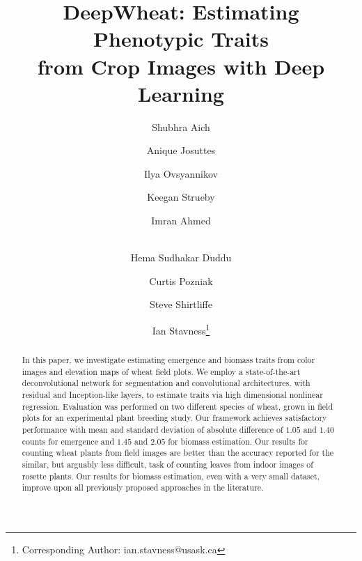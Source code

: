 \documentclass[10pt,twocolumn,letterpaper]{article}
\begin{document}
\title{DeepWheat: Estimating Phenotypic Traits \\from Crop Images with Deep Learning}


\author[1]{\vspace{-6pt}
Shubhra Aich}
\author[2]{Anique Josuttes}
\author[1]{Ilya Ovsyannikov}
\author[2]{Keegan Strueby}
\author[1]{Imran Ahmed}
\author[2]{\\Hema Sudhakar Duddu}
\author[2,3]{Curtis Pozniak}
\author[2]{Steve Shirtliffe}
\author[1]{Ian Stavness\thanks{Corresponding Author: ian.stavness@usask.ca}}






\maketitle

\ifwacvfinal\thispagestyle{empty}\fi

\begin{abstract}
In this paper, we investigate estimating emergence and biomass traits from color images and elevation maps of wheat field plots. We employ a state-of-the-art deconvolutional network for segmentation and convolutional architectures, with residual and Inception-like layers, to estimate traits via high dimensional nonlinear regression. Evaluation was performed on two different species of wheat, grown in field plots for an experimental plant breeding study. Our framework achieves satisfactory performance with mean and standard deviation of absolute difference of $1.05$ and $1.40$ counts for emergence and $1.45$ and $2.05$ for biomass estimation. Our results for counting wheat plants from field images are better than the accuracy reported for the similar, but arguably less difficult, task of counting leaves from indoor images of rosette plants. Our results for biomass estimation, even with a very small dataset, improve upon all previously proposed approaches in the literature.
\end{abstract}
\end{document}
